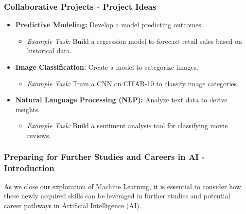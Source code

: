 \documentclass{beamer}
\begin{document}
\begin{frame}[fragile]
    \frametitle{Collaborative Projects - Project Ideas}
    \begin{itemize}
        \item \textbf{Predictive Modeling:} Develop a model predicting outcomes.
            \begin{itemize}
                \item \textit{Example Task:} Build a regression model to forecast retail sales based on historical data.
            \end{itemize}
        \item \textbf{Image Classification:} Create a model to categorize images.
            \begin{itemize}
                \item \textit{Example Task:} Train a CNN on CIFAR-10 to classify image categories.
            \end{itemize}
        \item \textbf{Natural Language Processing (NLP):} Analyze text data to derive insights.
            \begin{itemize}
                \item \textit{Example Task:} Build a sentiment analysis tool for classifying movie reviews.
            \end{itemize}
    \end{itemize}
\end{frame}

\begin{frame}[fragile]
    \frametitle{Preparing for Further Studies and Careers in AI - Introduction}
    As we close our exploration of Machine Learning, it is essential to consider how these newly acquired skills can be leveraged in further studies and potential career pathways in Artificial Intelligence (AI).
\end{frame}
\end{document}
